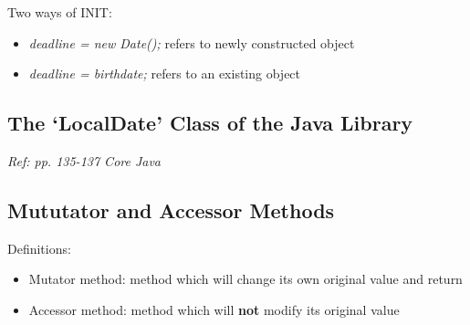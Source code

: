 \documentclass[12pt]{article}
\begin{document}
Two ways of INIT:
\begin{itemize}
    \item \textit{deadline = new Date();} refers to newly constructed object
    \item \textit{deadline = birthdate;} refers to an existing object
\end{itemize}

\subsection{The `LocalDate' Class of the Java Library}
\textit{Ref: pp. 135-137 Core Java}
\subsection{Mututator and Accessor Methods}
Definitions:
\begin{itemize}
    \item Mutator method: method which will change its own original value and return
    \item Accessor method: method which will \textbf{not} modify its original value  
\end{itemize}
\end{document}
